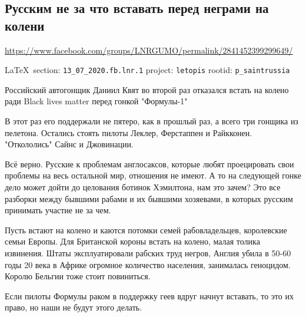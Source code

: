  
 

\subsection{Русским не за что вставать перед неграми на колени}
\label{sec:13_07_2020.fb.lnr.1}
\url{https://www.facebook.com/groups/LNRGUMO/permalink/2841452399299649/}

\vspace{0.5cm}
{\ifDEBUG\small\LaTeX~section: \verb|13_07_2020.fb.lnr.1| project: \verb|letopis| rootid: \verb|p_saintrussia|\fi}
\vspace{0.5cm}

  
Российский автогонщик Даниил Квят во второй раз отказался встать на колено ради
Black lives matter перед гонкой "Формулы-1"

В этот раз его поддержали не пятеро, как в прошлый раз, а всего три гонщика из
пелетона. Остались стоять пилоты Леклер, Ферстаппен и Райкконен. "Откололись"
Сайнс и Джовинации.

Всё верно. Русские к проблемам англосаксов, которые любят проецировать свои
проблемы на весь остальной мир, отношения не имеют. А то на следующей гонке
дело может дойти до целования ботинок Хэмилтона, нам это зачем? Это все
разборки между бывшими рабами и их бывшими хозяевами, в которых русским
принимать участие не за чем.

Пусть встают на колено и каются потомки семей рабовладельцев, королевские семьи
Европы. Для Британской короны встать на колено, малая толика извинения. Штаты
эксплуатировали рабских труд негров, Англия убила в 50-60 годы 20 века в Африке
огромное количество населения, занималась геноцидом. Королю Бельгии тоже стоит
повиниться.

Если пилоты Формулы раком в поддержку геев вдруг начнут вставать, то это их
право, но наши не будут этого делать.
